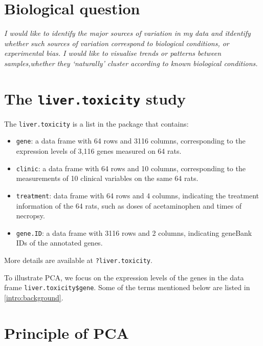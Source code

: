 \documentclass[]{book}
\begin{document}
\hypertarget{biological-question}{%
\section{Biological question}\label{biological-question}}

{
\emph{I would like to identify the major sources of variation in my data and itdentify whether such sources of variation correspond to biological conditions, or experimental bias. I would like to visualise trends or patterns between samples,whether they `naturally' cluster according to known biological conditions.}
}

\hypertarget{the-liver.toxicity-study}{%
\section{\texorpdfstring{The \texttt{liver.toxicity} study}{The liver.toxicity study}}\label{the-liver.toxicity-study}}

The \texttt{liver.toxicity} is a list in the package that contains:

\begin{itemize}
\item
  \texttt{gene}: a data frame with 64 rows and 3116 columns, corresponding to the expression levels of 3,116 genes measured on 64 rats.
\item
  \texttt{clinic}: a data frame with 64 rows and 10 columns, corresponding to the measurements of 10 clinical variables on the same 64 rats.
\item
  \texttt{treatment}: data frame with 64 rows and 4 columns, indicating the treatment information of the 64 rats, such as doses of acetaminophen and times of necropsy.
\item
  \texttt{gene.ID}: a data frame with 3116 rows and 2 columns, indicating geneBank IDs of the annotated genes.
\end{itemize}

More details are available at \texttt{?liver.toxicity}.

To illustrate PCA, we focus on the expression levels of the genes in the data frame \texttt{liver.toxicity\$gene}. Some of the terms mentioned below are listed in \ref{intro:background}.

\hypertarget{principle-of-pca}{%
\section{Principle of PCA}\label{principle-of-pca}}
\end{document}
